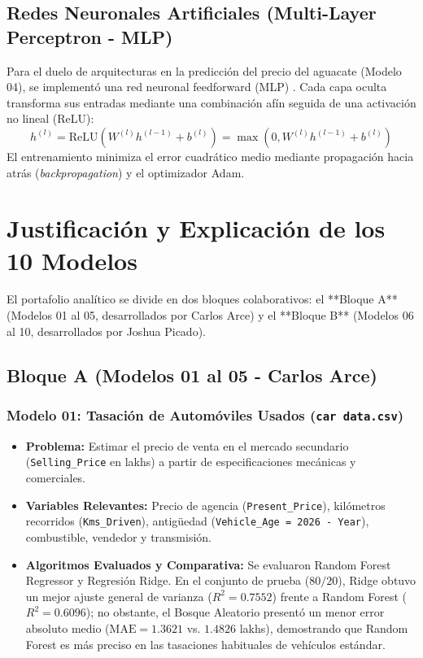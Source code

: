 \documentclass[12pt,letterpaper]{article}
\begin{document}
\subsection{Redes Neuronales Artificiales (Multi-Layer Perceptron - MLP)}
Para el duelo de arquitecturas en la predicción del precio del aguacate (Modelo 04), se implementó una red neuronal feedforward (MLP) \cite{goodfellow2016deep}. Cada capa oculta transforma sus entradas mediante una combinación afín seguida de una activación no lineal (ReLU):
\begin{equation}
    h^{(l)} = \text{ReLU}\left(W^{(l)} h^{(l-1)} + b^{(l)}\right) = \max\left(0, W^{(l)} h^{(l-1)} + b^{(l)}\right)
\end{equation}
El entrenamiento minimiza el error cuadrático medio mediante propagación hacia atrás (\textit{backpropagation}) y el optimizador Adam.

\section{Justificación y Explicación de los 10 Modelos}

El portafolio analítico se divide en dos bloques colaborativos: el **Bloque A** (Modelos 01 al 05, desarrollados por Carlos Arce) y el **Bloque B** (Modelos 06 al 10, desarrollados por Joshua Picado).

\subsection{Bloque A (Modelos 01 al 05 - Carlos Arce)}

\subsubsection{Modelo 01: Tasación de Automóviles Usados (\texttt{car data.csv})}
\begin{itemize}[leftmargin=*]
    \item \textbf{Problema:} Estimar el precio de venta en el mercado secundario (\texttt{Selling\_Price} en lakhs) a partir de especificaciones mecánicas y comerciales.
    \item \textbf{Variables Relevantes:} Precio de agencia (\texttt{Present\_Price}), kilómetros recorridos (\texttt{Kms\_Driven}), antigüedad (\texttt{Vehicle\_Age = 2026 - Year}), combustible, vendedor y transmisión.
    \item \textbf{Algoritmos Evaluados y Comparativa:} Se evaluaron Random Forest Regressor y Regresión Ridge. En el conjunto de prueba ($80/20$), Ridge obtuvo un mejor ajuste general de varianza ($R^2 = 0.7552$) frente a Random Forest ($R^2 = 0.6096$); no obstante, el Bosque Aleatorio presentó un menor error absoluto medio ($\text{MAE} = 1.3621$ vs. $1.4826$ lakhs), demostrando que Random Forest es más preciso en las tasaciones habituales de vehículos estándar.
\end{itemize}
\end{document}
